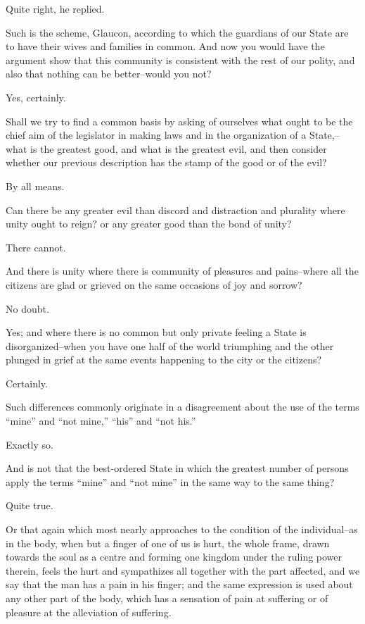 Quite right, he replied.

Such is the scheme, Glaucon, according to which the guardians of our
State are to have their wives and families in common. And now you would
have the argument show that this community is consistent with the rest
of our polity, and also that nothing can be better--would you not?

Yes, certainly.

Shall we try to find a common basis by asking of ourselves what ought
to be the chief aim of the legislator in making laws and in the
organization of a State,--what is the greatest good, and what is the
greatest evil, and then consider whether our previous description has
the stamp of the good or of the evil?

By all means.

Can there be any greater evil than discord and distraction and plurality
where unity ought to reign? or any greater good than the bond of unity?

There cannot.

And there is unity where there is community of pleasures and
pains--where all the citizens are glad or grieved on the same occasions
of joy and sorrow?

No doubt.

Yes; and where there is no common but only private feeling a State is
disorganized--when you have one half of the world triumphing and the
other plunged in grief at the same events happening to the city or the
citizens?

Certainly.

Such differences commonly originate in a disagreement about the use of
the terms ``mine'' and ``not mine,'' ``his'' and ``not his.''

Exactly so.

And is not that the best-ordered State in which the greatest number of
persons apply the terms ``mine'' and ``not mine'' in the same way to the
same thing?

Quite true.

Or that again which most nearly approaches to the condition of the
individual--as in the body, when but a finger of one of us is hurt, the
whole frame, drawn towards the soul as a centre and forming one kingdom
under the ruling power therein, feels the hurt and sympathizes all
together with the part affected, and we say that the man has a pain in
his finger; and the same expression is used about any other part of the
body, which has a sensation of pain at suffering or of pleasure at the
alleviation of suffering.

